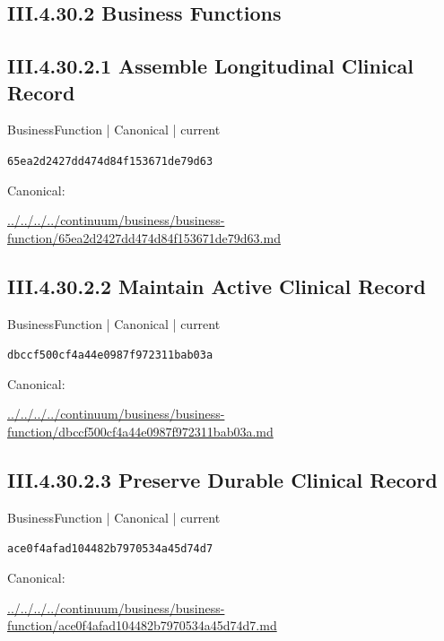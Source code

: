 \documentclass[10pt,a4paper]{article}
\begin{document}
\subsection*{III.4.30.2 Business Functions}
\subsection*{III.4.30.2.1 Assemble Longitudinal Clinical Record}
{\small BusinessFunction | Canonical | current}\par
\texttt{65ea2d2427dd474d84f153671de79d63}\par
Canonical: \par
{\footnotesize\url{../../../../continuum/business/business-function/65ea2d2427dd474d84f153671de79d63.md}}\par
\subsection*{III.4.30.2.2 Maintain Active Clinical Record}
{\small BusinessFunction | Canonical | current}\par
\texttt{dbccf500cf4a44e0987f972311bab03a}\par
Canonical: \par
{\footnotesize\url{../../../../continuum/business/business-function/dbccf500cf4a44e0987f972311bab03a.md}}\par
\subsection*{III.4.30.2.3 Preserve Durable Clinical Record}
{\small BusinessFunction | Canonical | current}\par
\texttt{ace0f4afad104482b7970534a45d74d7}\par
Canonical: \par
{\footnotesize\url{../../../../continuum/business/business-function/ace0f4afad104482b7970534a45d74d7.md}}\par
\end{document}
